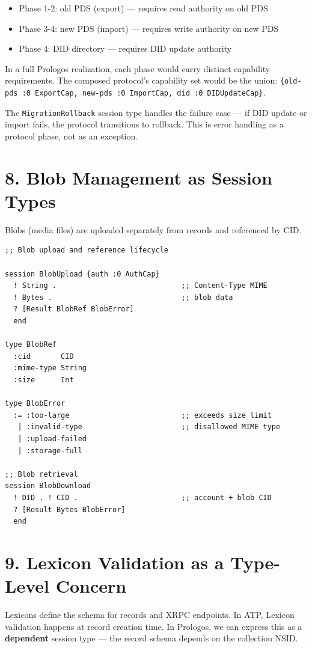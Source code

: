 \documentclass[11pt]{article}
\begin{document}
\begin{itemize}
\item Phase 1-2: old PDS (export) — requires read authority on old PDS
\item Phase 3-4: new PDS (import) — requires write authority on new PDS
\item Phase 4: DID directory — requires DID update authority
\end{itemize}

In a full Prologos realization, each phase would carry distinct capability
requirements. The composed protocol's capability set would be the union:
\texttt{\{old-pds :0 ExportCap, new-pds :0 ImportCap, did :0 DIDUpdateCap\}}.

The \texttt{MigrationRollback} session type handles the failure case — if DID
update or import fails, the protocol transitions to rollback. This is
error handling as a protocol phase, not as an exception.
\section{8. Blob Management as Session Types}
\label{sec:org896e53a}

Blobs (media files) are uploaded separately from records and referenced by CID.

\begin{verbatim}
;; Blob upload and reference lifecycle

session BlobUpload {auth :0 AuthCap}
  ! String .                             ;; Content-Type MIME
  ! Bytes .                              ;; blob data
  ? [Result BlobRef BlobError]
  end

type BlobRef
  :cid       CID
  :mime-type String
  :size      Int

type BlobError
  := :too-large                          ;; exceeds size limit
   | :invalid-type                       ;; disallowed MIME type
   | :upload-failed
   | :storage-full

;; Blob retrieval
session BlobDownload
  ! DID . ! CID .                        ;; account + blob CID
  ? [Result Bytes BlobError]
  end
\end{verbatim}
\section{9. Lexicon Validation as a Type-Level Concern}
\label{sec:orgd99672a}

Lexicons define the schema for records and XRPC endpoints. In ATP, Lexicon
validation happens at record creation time. In Prologos, we can express
this as a \textbf{dependent} session type — the record schema depends on the
collection NSID.
\end{document}
